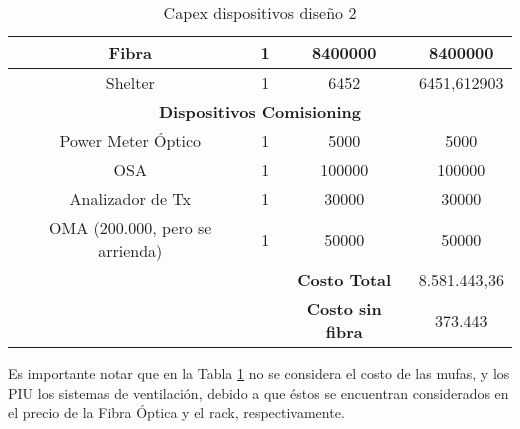\begin{table}[H]
\begin{tabular}{cc|c|c|}
\multicolumn{1}{|c|}{Fibra} & 1 & 8400000 & 8400000 \\ \hline
\multicolumn{1}{|c|}{Shelter} & 1 & 6452 & 6451,612903 \\ \hline
\multicolumn{4}{|c|}{\textbf{Dispositivos Comisioning}} \\ \hline
\multicolumn{1}{|c|}{Power Meter Óptico} & 1 & 5000 & 5000 \\ \hline
\multicolumn{1}{|c|}{OSA} & 1 & 100000 & 100000 \\ \hline
\multicolumn{1}{|c|}{Analizador de Tx} & 1 & 30000 & 30000 \\ \hline
\multicolumn{1}{|c|}{OMA (200.000, pero se arrienda)} & 1 & 50000 & 50000 \\ \hline
\multicolumn{1}{l}{} & \multicolumn{1}{l|}{} & \textbf{Costo Total} & 8.581.443,36 \\ \cline{3-4} 
\multicolumn{1}{l}{} & \multicolumn{1}{l|}{} & \textbf{Costo sin fibra} & 373.443 \\ \cline{3-4} 
\end{tabular}
\caption{Capex dispositivos diseño 2}
\label{tab:capex_disp_2}
\end{table}

\newp
Es importante notar que en la Tabla \ref{tab:capex_disp_2} no se considera el costo de las mufas, y los PIU los sistemas de ventilación, debido a que éstos se encuentran considerados en el precio de la Fibra Óptica y el rack, respectivamente.

